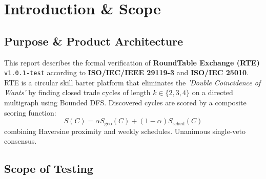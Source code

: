 \documentclass[12pt,a4paper]{report}
\begin{document}

\restoregeometry

\tableofcontents
\newpage


\chapter{Introduction \& Scope}

\section{Purpose \& Product Architecture}
This report describes the formal verification of \textbf{RoundTable Exchange (RTE)} \texttt{v1.0.1-test} according to \textbf{ISO/IEC/IEEE 29119-3} and \textbf{ISO/IEC 25010}. RTE is a circular skill barter platform that eliminates the \textit{'Double Coincidence of Wants'} by finding closed trade cycles of length $k \in \{2, 3, 4\}$ on a directed multigraph using Bounded DFS. Discovered cycles are scored by a composite scoring function:
\begin{equation}
S(C) = \alpha S_{\text{geo}}(C) + (1 - \alpha) S_{\text{sched}}(C)
\end{equation}
combining Haversine proximity and weekly schedules. Unanimous single-veto consensus.

\section{Scope of Testing}
\end{document}
